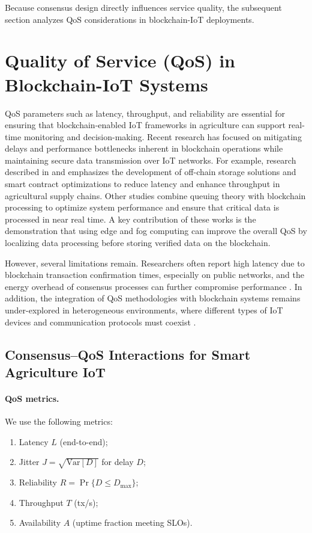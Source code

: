 \documentclass[12pt,onecolumn]{IEEEtran} %
\begin{document}
Because consensus design directly influences service quality, the subsequent section analyzes QoS considerations in blockchain-IoT deployments.

\section{Quality of Service (QoS) in Blockchain-IoT Systems}\label{sec:qos}
QoS parameters such as latency, throughput, and reliability are essential for ensuring that blockchain-enabled IoT frameworks in agriculture can support real-time monitoring and decision-making. Recent research has focused on mitigating delays and performance bottlenecks inherent in blockchain operations while maintaining secure data transmission over IoT networks. For example, research described in \cite{ellahi2023blockchainbasedframeworksfor} and \cite{ellahi2023blockchainbasedframeworksfor} emphasizes the development of off-chain storage solutions and smart contract optimizations to reduce latency and enhance throughput in agricultural supply chains. Other studies \cite{khan2022ablockchainand, sizan2505asecuredtriad} combine queuing theory with blockchain processing to optimize system performance and ensure that critical data is processed in near real time. A key contribution of these works is the demonstration that using edge and fog computing can improve the overall QoS by localizing data processing before storing verified data on the blockchain.

However, several limitations remain. Researchers often report high latency due to blockchain transaction confirmation times, especially on public networks, and the energy overhead of consensus processes can further compromise performance \cite{saha2022blockchainchangingthe, ali2022blockchainenabledarchitecture}. In addition, the integration of QoS methodologies with blockchain systems remains under-explored in heterogeneous environments, where different types of IoT devices and communication protocols must coexist \cite{sakthivel2024enhancingtransparencyand, sajja2023towardsapplicabilityof}.
  \subsection{Consensus–QoS Interactions for Smart Agriculture IoT}\label{subsec:qos-interactions}

  
\label{sec:consensus-qos}

\paragraph{QoS metrics.}
We use the following metrics:
\begin{enumerate}
    \item Latency $L$ (end-to-end);
    \item Jitter $J=\sqrt{\mathrm{Var}[D]}$ for delay $D$;
    \item Reliability $R=\Pr\{D\le D_{\max}\}$;
    \item Throughput $T$ (tx/s);
    \item Availability $A$ (uptime fraction meeting SLOs).
\end{enumerate}
\end{document}
